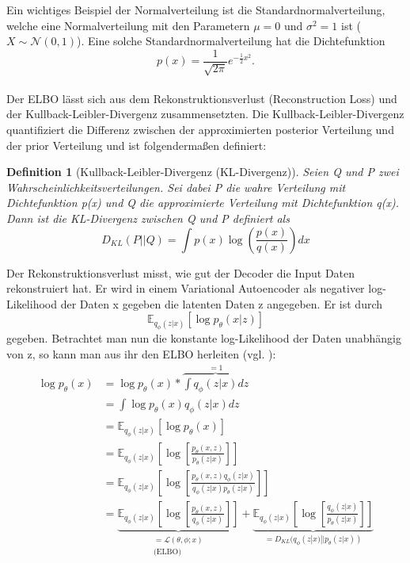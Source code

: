 \documentclass[%
thesis=student,%
coverpage=false,%
titlepage=false,%
headmarks=true, %
german,%
font=libertine, %
math=newpxtx, %
BCOR=5mm,%
coverBCOR=11mm%
]{tumbook}
\theoremstyle{break}
\newtheorem{definition}{Definition}[section]
\begin{document}
Ein wichtiges Beispiel der Normalverteilung ist die Standardnormalverteilung, welche eine Normalverteilung mit den Parametern $\mu = 0$ und  $\sigma^2 = 1$ ist ($X \sim \mathcal{N}(0,1)$). Eine solche Standardnormalverteilung hat die Dichtefunktion\\
$$p(x) = \frac{1}{\sqrt{2\pi}} e^{-\frac{1}{2}x^2}.$$
\\
Der ELBO lässt sich aus dem Rekonstruktionsverlust (Reconstruction Loss) und der Kullback-Leibler-Divergenz zusammensetzten. Die Kullback-Leibler-Divergenz quantifiziert die Differenz zwischen der approximierten posterior Verteilung und der prior Verteilung und ist folgendermaßen definiert:\\
\begin{definition}[Kullback-Leibler-Divergenz (KL-Divergenz)]
Seien Q und P zwei Wahrscheinlichkeitsverteilungen. 
Sei dabei P die wahre Verteilung mit Dichtefunktion p(x) und Q die approximierte Verteilung mit Dichtefunktion q(x). Dann ist die KL-Divergenz zwischen Q und P definiert als
$$D_{KL}(P||Q)= \int p(x) \log \left(\frac{p(x)}{q(x)} \right)dx$$
\end{definition}\noindent
Der Rekonstruktionsverlust misst, wie gut der Decoder die Input Daten rekonstruiert hat. Er wird in einem Variational Autoencoder als negativer log-Likelihood der Daten x gegeben die latenten Daten z angegeben. Er ist durch 
$$\mathbb{E}_{q_\phi(z|x)}[\log p_\theta(x|z)] $$ gegeben. Betrachtet man nun die konstante log-Likelihood der Daten unabhängig von z, so kann man aus ihr den ELBO herleiten (vgl. \cite{IntroductiontoVAEs}):\\
\begin{align}
 	\log p_\theta(x) &= \log p_\theta(x) * \overbrace{\int q_\phi(z|x) dz}^{=1} \\
 	&= \int \log p_\theta(x) q_\phi(z|x) dz \\
 	&= \mathbb{E}_{q_\phi(z|x)}[\log p_\theta(x)] \\
 	&= \mathbb{E}_{q_\phi(z|x)}\left[\log\left[ \frac{p_\theta(x,z)}{p_\theta(z|x)}\right]\right] \\
 	&= \mathbb{E}_{q_\phi(z|x)}\left[\log\left[ \frac{p_\theta(x,z)q_\phi(z|x)}{q_\phi(z|x)p_\theta(z|x)}\right]\right] \\
 	&= \underbrace{\mathbb{E}_{q_\phi(z|x)}\left[\log\left[ \frac{p_\theta(x,z)}{q_\phi(z|x)}\right]\right]}_{\substack{\text{$= \mathcal{L}(\theta,\phi;x)$}\\\text{(ELBO)}}} + \underbrace{\mathbb{E}_{q_\phi(z|x)}\left[\log\left[ \frac{q_\phi(z|x)}{p_\theta(z|x)}\right]\right]}_{=D_{KL}(q_\phi(z|x)||p_\theta(z|x))} \label{ELBO & DKL Gleichung}
\end{align}
\end{document}

